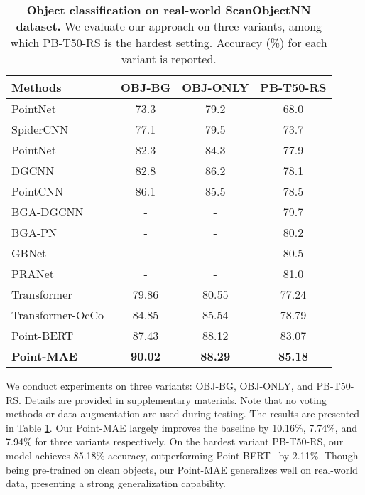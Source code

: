 \documentclass[runningheads]{llncs}
\begin{document}
\begin{table}
\begin{center}
\caption{{\bf Object classification on real-world ScanObjectNN dataset.} We evaluate our approach on three variants, among which PB-T50-RS is the hardest setting. Accuracy (\%) for each variant is reported.}
\setlength\tabcolsep{5pt}
\label{tb:2}
\begin{tabular}{l|ccc}
\hline
Methods & OBJ-BG & OBJ-ONLY & PB-T50-RS  \\

\hline

 PointNet~\cite{pointnet}& 73.3 & 79.2 & 68.0 \\
 SpiderCNN~\cite{ptspidercnn}& 77.1 & 79.5 & 73.7 \\
 PointNet~\cite{pointnet++}& 82.3 & 84.3 & 77.9 \\
 DGCNN~\cite{ptdgcnn}& 82.8& 86.2 & 78.1 \\
 PointCNN~\cite{ptptcnn}& 86.1 & 85.5 & 78.5 \\
 BGA-DGCNN~\cite{scan}& - & - & 79.7 \\
 BGA-PN~\cite{scan}& - & - & 80.2 \\
 GBNet~\cite{ptgbnet}& - & - & 80.5 \\
 PRANet~\cite{ptpranet}& - & - & 81.0 \\
\hline
 Transformer~\cite{pointbert}& 79.86 & 80.55 & 77.24 \\
 Transformer-OcCo~\cite{pointbert}& 84.85 & 85.54 & 78.79 \\
 Point-BERT~\cite{pointbert}& 87.43 & 88.12 & 83.07 \\
 {\bf Point-MAE}& {\bf 90.02}&{\bf 88.29} &{\bf 85.18} \\
\hline
\end{tabular}
\end{center}
\end{table}


We conduct experiments on three variants: OBJ-BG, OBJ-ONLY, and PB-T50-RS. Details are provided in supplementary materials. Note that no voting methods or data augmentation are used during testing. The results are presented in Table \ref{tb:2}. Our Point-MAE largely improves the baseline by 10.16\%, 7.74\%, and 7.94\% for three variants respectively. On the hardest variant PB-T50-RS, our model achieves 85.18\% accuracy, outperforming Point-BERT~\cite{pointbert} by 2.11\%. Though being pre-trained on clean objects, our Point-MAE generalizes well on real-world data, presenting a strong generalization capability. 
\end{document}
